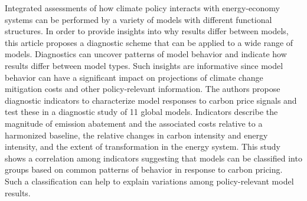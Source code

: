 Integrated assessments of how climate policy interacts with energy-economy systems can be performed by a variety of models with different functional structures. In order to provide insights into why results differ between models, this article proposes a diagnostic scheme that can be applied to a wide range of models. Diagnostics can uncover patterns of model behavior and indicate how results differ between model types. Such insights are informative since model behavior can have a significant impact on projections of climate change mitigation costs and other policy-relevant information. The authors propose diagnostic indicators to characterize model responses to carbon price signals and test these in a diagnostic study of 11 global models. Indicators describe the magnitude of emission abatement and the associated costs relative to a harmonized baseline, the relative changes in carbon intensity and energy intensity, and the extent of transformation in the energy system. This study shows a correlation among indicators suggesting that models can be classified into groups based on common patterns of behavior in response to carbon pricing. Such a classification can help to explain variations among policy-relevant model results.